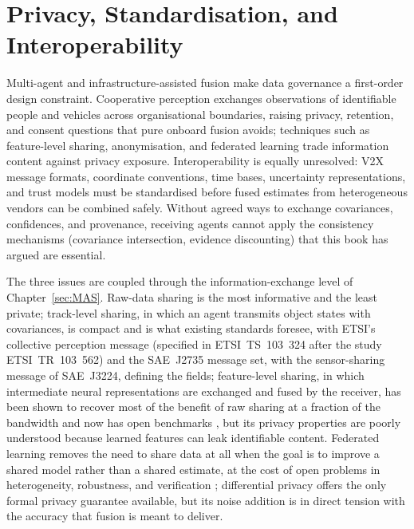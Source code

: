 \section{Privacy, Standardisation, and Interoperability}
\label{subsec:oc-privacy}
Multi-agent and infrastructure-assisted fusion make data governance a first-order design constraint. Cooperative perception exchanges observations of identifiable people and vehicles across organisational boundaries, raising privacy, retention, and consent questions that pure onboard fusion avoids; techniques such as feature-level sharing, anonymisation, and federated learning trade information content against privacy exposure. Interoperability is equally unresolved: V2X message formats, coordinate conventions, time bases, uncertainty representations, and trust models must be standardised before fused estimates from heterogeneous vendors can be combined safely. Without agreed ways to exchange covariances, confidences, and provenance, receiving agents cannot apply the consistency mechanisms (covariance intersection, evidence discounting) that this book has argued are essential.

The three issues are coupled through the information-exchange level of Chapter~\ref{sec:MAS}. Raw-data sharing is the most informative and the least private; track-level sharing, in which an agent transmits object states with covariances, is compact and is what existing standards foresee, with ETSI's collective perception message (specified in ETSI~TS~103~324 after the study ETSI~TR~103~562) and the SAE~J2735 message set, with the sensor-sharing message of SAE~J3224, defining the fields; feature-level sharing, in which intermediate neural representations are exchanged and fused by the receiver, has been shown to recover most of the benefit of raw sharing at a fraction of the bandwidth \cite{wang2020_v2vnet} and now has open benchmarks \cite{xu2022_opv2v}, but its privacy properties are poorly understood because learned features can leak identifiable content. Federated learning \cite{mcmahan2017_fedavg} removes the need to share data at all when the goal is to improve a shared model rather than a shared estimate, at the cost of open problems in heterogeneity, robustness, and verification \cite{kairouz2021_federated}; differential privacy \cite{dwork2006_dp,dwork2014_algorithmic_dp} offers the only formal privacy guarantee available, but its noise addition is in direct tension with the accuracy that fusion is meant to deliver.

